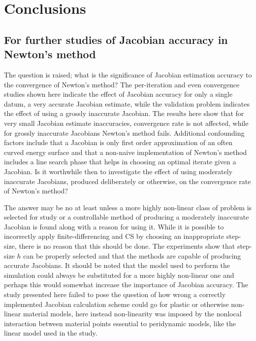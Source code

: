 \documentclass[preprint,12pt]{elsarticle}
\begin{document}
\section{Conclusions}
\label{sec:Conc}
%
\subsection{For further studies of Jacobian accuracy in Newton's method}
\label{subsec:FurtherStudies}
The question is raised; what is the significance of Jacobian estimation
accuracy to the convergence of Newton's method?  The per-iteration and even
convergence studies shown here indicate the effect of Jacobian accuracy for
only a single datum, a very accurate Jacobian estimate, while the validation
problem indicates the effect of using a grossly inaccurate Jacobian. The results here show that
for very small Jacobian estimate inaccuracies, convergence rate is not
affected, while for grossly inaccurate Jacobians Newton's method fails. 
Additional confounding factors include that a Jacobian is only first
order approximation of an often curved energy surface and that a non-naive implementation of Newton's
method includes a line search phase that helps in choosing an optimal iterate given a Jacobian.
Is it worthwhile then to investigate the effect of using moderately inaccurate Jacobians, 
produced deliberately or otherwise, on the convergence rate of Newton's method?

The answer may be no at least unless a more highly non-linear class of problem
is selected for study or a controllable method of producing a moderately
inaccurate Jacobian is found along with a reason for using it. While it is possible
to incorrectly apply finite-differencing and CS by choosing an inappropriate
step-size, there is no reason that this should be done. The experiments show
that step-size $h$ can be properly selected and that the methods are capable of
producing accurate Jacobians. It should be noted that the model used to perform
the simulation could always be substituted for a more highly non-linear one and
perhaps this would somewhat increase the importance of Jacobian accuracy. The
study presented here failed to pose the question of how wrong a correctly
implemented Jacobian calculation scheme could go for plastic or otherwise
non-linear material models, here instead non-linearity was imposed by the
nonlocal interaction between material points essential to peridynamic models,
like the linear model used in the study. 
\end{document}
